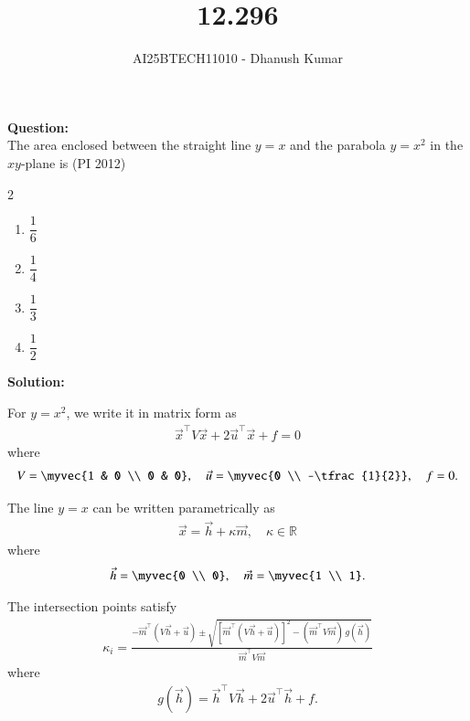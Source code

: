 \documentclass[journal]{IEEEtran}
\begin{document}
\title{12.296}
\author{AI25BTECH11010 - Dhanush Kumar}
\maketitle
\renewcommand{\thefigure}{\theenumi}
\renewcommand{\thetable}{\theenumi}

\noindent\textbf{Question:}\\
The area enclosed between the straight line $y = x$ and the parabola $y = x^2$ in the $xy$-plane is (PI 2012)

\begin{multicols}{2}
\begin{enumerate}
\item $\dfrac{1}{6}$
\item $\dfrac{1}{4}$
\item $\dfrac{1}{3}$
\item $\dfrac{1}{2}$
\end{enumerate}
\end{multicols}

\noindent\textbf{Solution:}

For $y = x^2$, we write it in matrix form as
\begin{align}
\vec{x}^{\top} V \vec{x} + 2\vec{u}^{\top}\vec{x} + f = 0
\end{align}
where
\begin{align}
V = \myvec{1 & 0 \\ 0 & 0}, \quad 
\vec{u} = \myvec{0 \\ -\tfrac{1}{2}}, \quad 
f = 0.
\end{align}

The line $y = x$ can be written parametrically as
\begin{align}
\vec{x} = \vec{h} + \kappa \vec{m}, \quad \kappa \in \mathbb{R}
\end{align}
where
\begin{align}
\vec{h} = \myvec{0 \\ 0}, \quad 
\vec{m} = \myvec{1 \\ 1}.
\end{align}

The intersection points satisfy
\begin{align}
\kappa_i =
\frac{-\vec{m}^{\top}(V\vec{h} + \vec{u}) 
\pm \sqrt{[\vec{m}^{\top}(V\vec{h} + \vec{u})]^2 
- (\vec{m}^{\top}V\vec{m})\,g(\vec{h})}}
{\vec{m}^{\top}V\vec{m}}
\end{align}
where
\begin{align}
g(\vec{h}) = \vec{h}^{\top}V\vec{h} + 2\vec{u}^{\top}\vec{h} + f.
\end{align}
\end{document}
